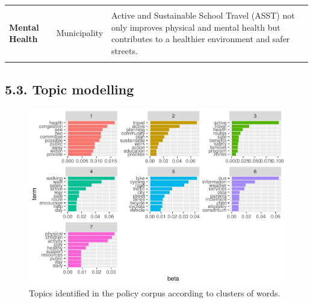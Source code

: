 \documentclass[]{elsarticle} %
\begin{document}
\begin{table}
\begin{tabular}[t]{>{}ll>{\raggedright\arraybackslash}p{20em}}
\textbf{\cellcolor{gray!6}{Lanes}} & \cellcolor{gray!6}{Municipality} & \cellcolor{gray!6}{We are continuing to build on the cycling and pedestrian network by adding more bike lanes, building multi-use paths and encouraging developments to provide better pedestrian/cycling environments.}\\
\textbf{Mental Health} & Municipality & Active and Sustainable School Travel (ASST) not only improves physical and mental health but contributes to a healthier environment and safer streets.\\
\textbf{\cellcolor{gray!6}{Physical Health}} & \cellcolor{gray!6}{Municipality} & \cellcolor{gray!6}{Encouraging Active Transportation promotes personal health and recreation, helps manage congestion, reduces emissions and supports municipal objectives for efficient land use.}\\
\bottomrule
\end{tabular}
\end{table}

\hypertarget{topic-modelling}{%
\subsection{5.3. Topic modelling}\label{topic-modelling}}

\begin{figure}
\includegraphics[width=1\linewidth]{AST-Framing-Ontario_files/figure-latex/policy-terms-1} \caption{\label{fig:policy-terms}Topics identified in the policy corpus according to clusters of words.}\label{fig:policy-terms}
\end{figure}
\end{document}
